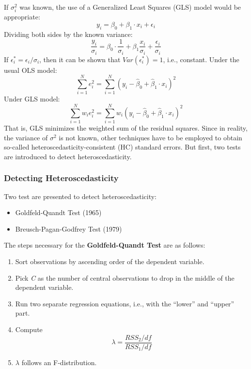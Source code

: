 \documentclass[
]{article}
\providecommand{\tightlist}{%
  \setlength{\itemsep}{0pt}\setlength{\parskip}{0pt}}
\begin{document}
If \(\sigma_i^2\) was known, the use of a Generalized Least Squares (GLS) model would be appropriate:
\[y_i = \beta_0 + \beta_1 \cdot x_i + \epsilon_i\]
Dividing both sides by the known variance:
\[\frac{y_i}{\sigma_i}=\beta_0 \cdot \frac{1}{\sigma_i}+\beta_1 \frac{x_i}{\sigma_i}+\frac{\epsilon_i}{\sigma_i}\]
If \(\epsilon^*_i = \epsilon_i / \sigma_i\), then it can be shown that \(Var(\epsilon^*_i)=1\), i.e., constant. Under the usual OLS model:
\[\sum_{i=1}^N e_i^2=\sum_{i=1}^N \left(y_i-\hat{\beta}_0+\hat{\beta}_1 \cdot x_i \right)^2\]
Under GLS model:
\[\sum_{i=1}^N w_i e_i^2= \sum_{i=1}^N w_i \left(y_i-\hat{\beta}_0+\hat{\beta}_1 \cdot x_i \right)^2\]
That is, GLS minimizes the weighted sum of the residual squares. Since in reality, the variance of \(\sigma^2\) is not known, other techniques have to be employed to obtain so-called heteroscedasticity-consistent (HC) standard errors. But first, two tests are introduced to detect heteroscedasticity.

\hypertarget{detecting-heteroscedasticity}{%
\subsubsection{Detecting Heteroscedasticity}\label{detecting-heteroscedasticity}}

Two test are presented to detect heteroscedasticity:

\begin{itemize}
\tightlist
\item
  Goldfeld-Quandt Test (1965)
\item
  Breusch-Pagan-Godfrey Test (1979)
\end{itemize}

The steps necessary for the \textbf{Goldfeld-Quandt Test} are as follows:

\begin{enumerate}
\def\labelenumi{\arabic{enumi}.}
\tightlist
\item
  Sort observations by ascending order of the dependent variable.
\item
  Pick \emph{C} as the number of central observations to drop in the middle of the dependent variable.
\item
  Run two separate regression equations, i.e., with the ``lower'' and ``upper'' part.
\item
  Compute
  \[\lambda = \frac{RSS_2/df}{RSS_1/df}\]
\item
  \(\lambda\) follows an F-distribution.
\end{enumerate}
\end{document}
